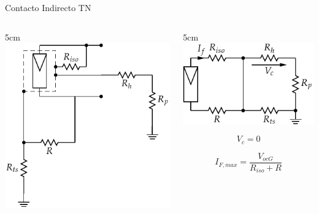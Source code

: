 \documentclass[xcolor={usenames,svgnames,dvipsnames}]{beamer}
\begin{document}
\begin{frame}[label=sec-2-3-2]{Contacto Indirecto TN}
\begin{columns}
\begin{column}{5cm\textwidth}
\includegraphics[width=\textwidth]{../figs/ContactoIndirectoTN.pdf}
\end{column}

\begin{column}{5cm\textwidth}
\includegraphics[width=\textwidth]{../figs/ContactoIndirectoTN_simple.pdf}

$$V_{c}=0$$

$$I_{F,max}=\frac{V_{ocG}}{R_{iso}+R}$$
\end{column}
\end{columns}
\end{frame}
\end{document}
